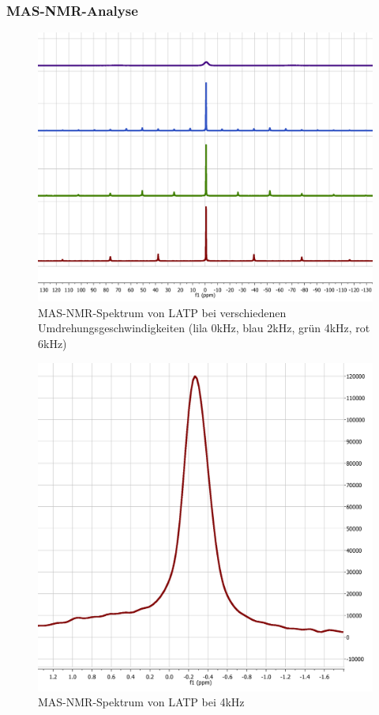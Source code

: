 \documentclass[a4paper, 11pt, headsepline,footsepline,twoside,abstract]{scrbook}
\begin{document}
\subsubsection{MAS-NMR-Analyse}
\begin{figure}
	\centering
	\includegraphics[width=1.0\columnwidth]{images/Spektrum_LATP.png}
	\caption{MAS-NMR-Spektrum von LATP bei verschiedenen Umdrehungsgeschwindigkeiten (lila 0kHz, blau 2kHz, grün 4kHz, rot 6kHz)}
	\label{nmr_mas_LATP}
\end{figure}
\begin{figure}
	\centering
	\includegraphics[width=1.0\columnwidth]{images/P410.png}
	\caption{MAS-NMR-Spektrum von LATP bei 4kHz}
	\label{nmr_mas_LATP2}
\end{figure}
\end{document}
